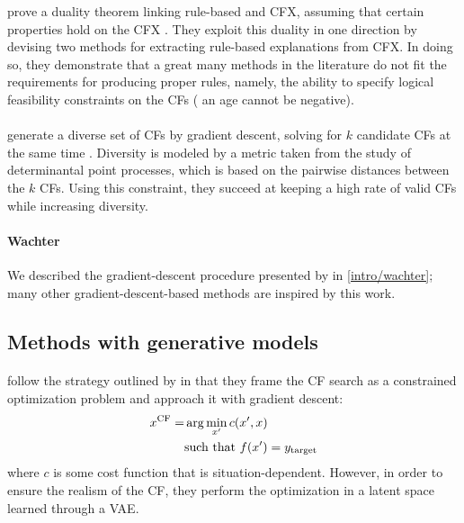 \documentclass[../main.tex]{subfiles}
\begin{document}
\citeauthor{gengComputing2022} prove a duality theorem linking rule-based and CFX, assuming that certain properties hold on the CFX \cite{gengComputing2022}.
They exploit this duality in one direction by devising two methods for extracting rule-based explanations from CFX.
In doing so, they demonstrate that a great many methods in the literature do not fit the requirements for producing proper rules, namely, the ability to specify logical feasibility constraints on the CFs (\eg{} an age cannot be negative).

\paragraph{}

\citeauthor{mothilalExplaining2020} generate a diverse set of CFs by gradient descent, solving for $k$ candidate CFs at the same time \cite{mothilalExplaining2020}.
Diversity is modeled by a metric taken from the study of determinantal point processes, which is based on the pairwise distances between the $k$ CFs.
Using this constraint, they succeed at keeping a high rate of valid CFs while increasing diversity.

\paragraph{Wachter}

We described the gradient-descent procedure presented by \citeauthor{wachterCounterfactual2017} \cite{wachterCounterfactual2017} in \autoref{intro/wachter}; many other gradient-descent-based methods are inspired by this work.

\subsection{Methods with generative models}

\paragraph{\revise}
\label{par:revise}

\citeauthor{joshiRealistic2019} follow the strategy outlined by \citeauthor{wachterCounterfactual2017} in that they frame the CF search as a constrained optimization problem and approach it with gradient descent:
\begin{align*}
	x^\mathrm{CF} = & \arg\min_{x'} c(x', x)              \\
	         & \text{such that } f(x') = y_{\mathrm{target}}
\end{align*}
where $c$ is some cost function that is situation-dependent.
However, in order to ensure the realism of the CF, they perform the optimization in a latent space learned through a VAE.
\end{document}
